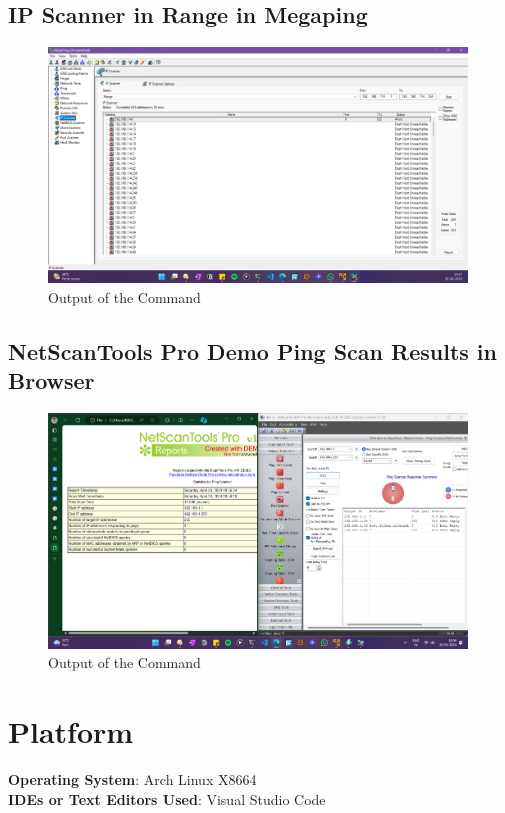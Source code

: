 \documentclass[11pt]{article}
\begin{document}
\subsection{IP Scanner in Range in Megaping}
\begin{figure}[H]
    \centering
    \includegraphics[width=0.99\textwidth]{megaping (4).png}
    \caption{Output of the Command}
\end{figure}
\subsection{NetScanTools Pro Demo Ping Scan Results in Browser}
\begin{figure}[H]
    \centering
    \includegraphics[width=0.99\textwidth]{statdemo (2).png}
    \caption{Output of the Command}
\end{figure}


\section{Platform}
\textbf{Operating System}: Arch Linux X8664 \\
\textbf{IDEs or Text Editors Used}: Visual Studio Code\\
\end{document}
